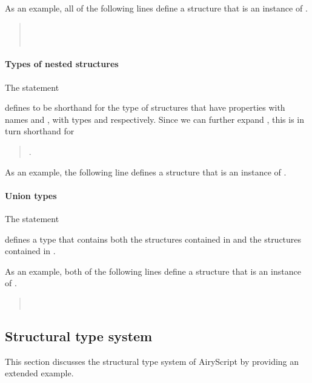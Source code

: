 As an example, all of the following lines define a structure that is an
instance of .
\begin{quote}
  \\
  \\
\end{quote}

\paragraph{Types of nested structures}
The statement
\begin{quote}
\end{quote}
defines  to be shorthand for the type of structures that have properties
with names  and , with types  and 
respectively. Since we can further expand , this is in turn shorthand for
\begin{quote}
  . 
\end{quote}

As an example, the following line defines a structure that is an instance of
.
\begin{quote}
\end{quote}

\paragraph{Union types}
The statement
\begin{quote}
\end{quote}
defines a type that contains both the structures contained in  and the
structures contained in .

As an example, both of the following lines define a structure that is an
instance of .
\begin{quote}
  \\
\end{quote}


\subsection{Structural type system}
This section discusses the structural type system of AiryScript by providing an
extended example.

